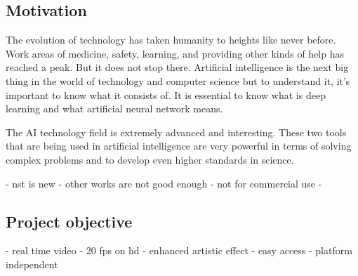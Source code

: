 \documentclass[../Main.tex]{subfiles}
\begin{document}
\subsection{Motivation}
The evolution of technology has taken humanity to heights like never before. Work areas of medicine, safety, learning, and providing other kinds of help has reached a peak. But it does not stop there. Artificial intelligence is the next big thing in the world of technology and computer science but to understand it, it’s important to know what it consists of. It is essential to know what is deep learning and what artificial neural network means.

The AI technology field is extremely advanced and interesting. These two tools that are being used in artificial intelligence are very powerful in terms of solving complex problems and to develop even higher standards in science.

- nst is new
- other works are not good enough - not for commercial use
- 


\subsection{Project objective}
- real time video
- 20 fps on hd
- enhanced artistic effect
- easy access 
- platform independent

\newpage
\end{document}
